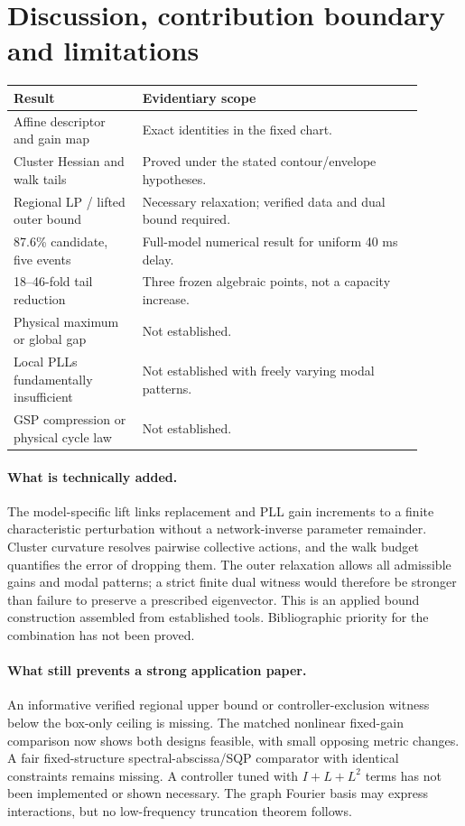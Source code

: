 \documentclass[11pt]{article}
\begin{document}
\section{Discussion, contribution boundary and limitations}
\begin{center}\small
\begin{tabular}{p{0.29\linewidth}p{0.61\linewidth}}\toprule
Result & Evidentiary scope\\\midrule
Affine descriptor and gain map & Exact identities in the fixed chart.\\
Cluster Hessian and walk tails & Proved under the stated contour/envelope hypotheses.\\
Regional LP / lifted outer bound & Necessary relaxation; verified data and dual bound required.\\
87.6\% candidate, five events & Full-model numerical result for uniform 40 ms delay.\\
18--46-fold tail reduction & Three frozen algebraic points, not a capacity increase.\\
Physical maximum or global gap & Not established.\\
Local PLLs fundamentally insufficient & Not established with freely varying modal patterns.\\
GSP compression or physical cycle law & Not established.\\\bottomrule
\end{tabular}
\end{center}

\paragraph{What is technically added.}
The model-specific lift links replacement and PLL gain increments
to a finite characteristic perturbation without a network-inverse
parameter remainder. Cluster curvature resolves pairwise collective
actions, and the walk budget quantifies the error of dropping them.
The outer relaxation allows all admissible gains and modal patterns;
a strict finite dual witness would therefore be stronger than
failure to preserve a prescribed eigenvector. This is an applied
bound construction assembled from established tools. Bibliographic
priority for the combination has not been proved.

\paragraph{What still prevents a strong application paper.}
An informative verified regional upper bound or controller-exclusion
witness below the box-only ceiling is missing. The matched nonlinear fixed-gain comparison now shows both designs
feasible, with small opposing metric changes. A fair fixed-structure
spectral-abscissa/SQP comparator with identical constraints remains missing. A controller tuned with $I+L+L^2$ terms has not been
implemented or shown necessary. The graph Fourier basis may express
interactions, but no low-frequency truncation theorem follows.
\end{document}

